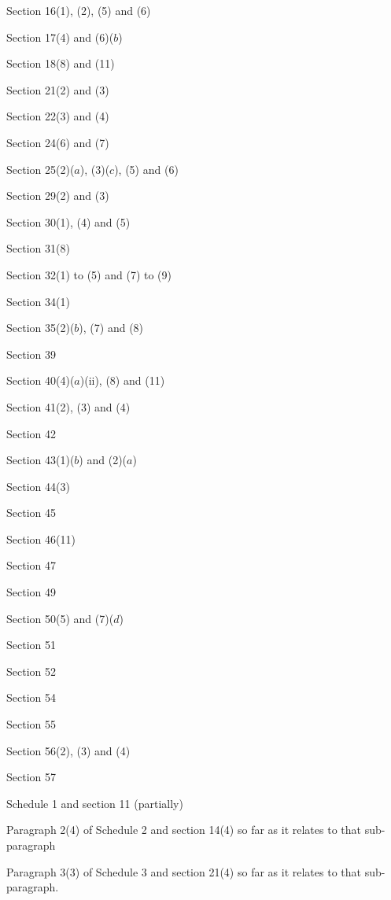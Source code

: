 \documentclass[a4paper]{article}
\begin{document}
  Section 16(1), (2), (5) and (6)

  Section 17(4) and (6)($b$)

  Section 18(8) and (11)

  Section 21(2) and (3)

  Section 22(3) and (4)

  Section 24(6) and (7)

  Section 25(2)($a$), (3)($c$), (5) and (6)

  Section 29(2) and (3)

  Section 30(1), (4) and (5)

  Section 31(8)

  Section 32(1) to (5) and (7) to (9)

  Section 34(1)

  Section 35(2)($b$), (7) and (8)

  Section 39

  Section 40(4)($a$)(ii), (8) and (11)

  Section 41(2), (3) and (4)

  Section 42

  Section 43(1)($b$) and (2)($a$)

  Section 44(3)

  Section 45

  Section 46(11)

  Section 47

  Section 49

  Section 50(5) and (7)($d$)

  Section 51

  Section 52

  Section 54

  Section 55

  Section 56(2), (3) and (4)

  Section 57

  Schedule 1 and section 11 (partially)

 Paragraph 2(4) of Schedule 2 and section 14(4) so far as it relates to that sub-paragraph

  Paragraph 3(3) of Schedule 3 and section 21(4) so far as it relates to that sub-paragraph.
\end{document}
